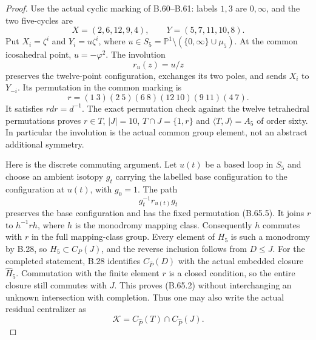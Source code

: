 \begin{proof}
Use the actual cyclic marking of B.60--B.61: labels $1,3$
are $0,\infty$, and the two five-cycles are
\[
 X=(2,6,12,9,4),\qquad Y=(5,7,11,10,8).
\]
Put $X_i=\zeta^i$ and $Y_i=u\zeta^i$, where
$u\in S_5=\mathbb P^1\setminus(\{0,\infty\}\cup\mu_5)$.
At the common icosahedral point, $u=-\varphi^2$.
The involution
\[
                    r_u(z)=u/z
                                                               \tag{B.65.4}
\]
preserves the twelve-point configuration, exchanges its two
poles, and sends $X_i$ to $Y_{-i}$.
Its permutation in the common marking is
\[
       r=(1\ 3)(2\ 5)(6\ 8)(12\ 10)(9\ 11)(4\ 7).
                                                               \tag{B.65.5}
\]
It satisfies $rdr=d^{-1}$.  The exact permutation check
against the twelve tetrahedral permutations proves
$r\in T$, $|J|=10$, $T\cap J=\{1,r\}$ and
$\langle T,J\rangle=A_5$ of order sixty.  In particular
the involution is the actual common group element, not
an abstract additional symmetry.

Here is the discrete commuting argument.
Let $u(t)$ be a based loop in $S_5$ and choose an ambient
isotopy $g_t$ carrying the labelled base configuration to
the configuration at $u(t)$, with $g_0=1$.
The path
\[
                    g_t^{-1}r_{u(t)}g_t
\]
preserves the base configuration and has the fixed
permutation (B.65.5).  It joins $r$ to $h^{-1}rh$,
where $h$ is the monodromy mapping class.
Consequently $h$ commutes with $r$ in the full mapping-class
group.  Every element of $H_5$ is such a monodromy by
B.28, so $H_5\subset C_P(J)$, and the reverse inclusion
follows from $D\leq J$.
For the completed statement, B.28 identifies
$C_{\widehat P}(D)$ with the actual embedded closure
$\widehat H_5$.  Commutation with the finite element $r$
is a closed condition, so the entire closure still commutes
with $J$.  This proves (B.65.2) without interchanging an
unknown intersection with completion.  Thus one may also
write the actual residual centralizer as
\[
       \mathcal K=C_{\widehat P}(T)\cap C_{\widehat P}(J).
                                                               \tag{B.65.6}
\]


\end{proof}
